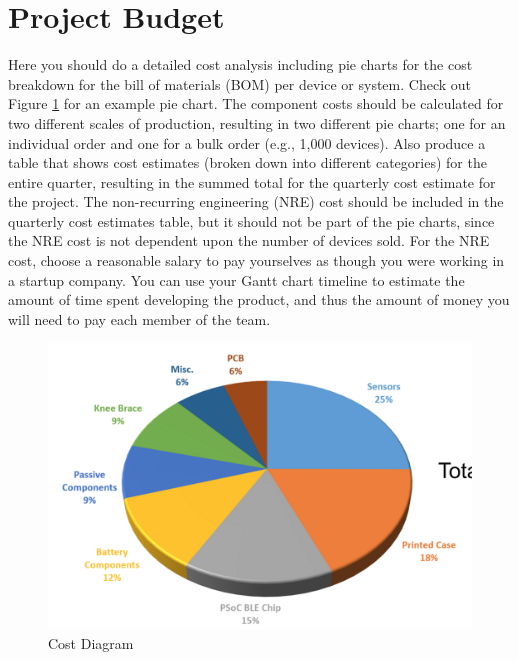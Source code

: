 \documentclass{sig-alternate-ipsn13}
\begin{document}

\section{Project Budget} 

Here you should do a detailed cost analysis including pie charts for the cost breakdown for the bill of materials (BOM) per device or system. Check out Figure \ref{fig:Cost} for an example pie chart. The component costs should be calculated for two different scales of production, resulting in two different pie charts; one for an individual order and one for a bulk order (e.g., 1,000 devices). Also produce a table that shows cost estimates (broken down into different categories) for the entire quarter, resulting in the summed total for the quarterly cost estimate for the project. The non-recurring engineering (NRE) cost should be included in the quarterly cost estimates table, but it should not be part of the pie charts, since the NRE cost is not dependent upon the number of devices sold. For the NRE cost, choose a reasonable salary to pay yourselves as though you were working in a startup company. You can use your Gantt chart timeline to estimate the amount of time spent developing the product, and thus the amount of money you will need to pay each member of the team.

\begin{figure}
  \centering 
	\includegraphics[width=\columnwidth]{images/cost.png}
    \caption{Cost Diagram}
    \label{fig:Cost}
\end{figure}
\end{document}

